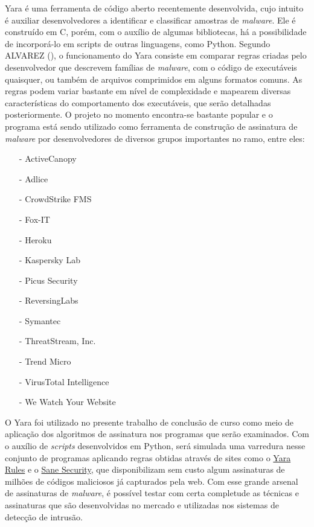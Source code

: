Yara é uma ferramenta de código aberto recentemente desenvolvida, cujo intuito é
auxiliar desenvolvedores a identificar e classificar amostras de
\textit{malware}. Ele é construído em C, porém, com o auxílio de algumas
bibliotecas, há a possibilidade de incorporá-lo em scripts de outras linguagens,
como Python. Segundo ALVAREZ (\citeyear{yararules}), o funcionamento do Yara consiste em comparar
regras criadas pelo desenvolvedor que descrevem famílias de \textit{malware},
com o código de executáveis quaisquer, ou também de arquivos comprimidos em
alguns formatos comuns. As regras podem variar bastante em nível de complexidade
e mapearem diversas características do comportamento dos executáveis, que serão
detalhadas posteriormente. O projeto no momento encontra-se bastante popular e o
programa está sendo utilizado como ferramenta de construção de assinatura de
\textit{malware} por desenvolvedores de diversos grupos importantes no ramo,
entre eles:
\begin{itemize}
	\item[-] ActiveCanopy
	\item[-] Adlice
	\item[-] CrowdStrike FMS
	\item[-] Fox-IT
	\item[-] Heroku
	\item[-] Kaspersky Lab
	\item[-] Picus Security
	\item[-] ReversingLabs
	\item[-] Symantec
	\item[-] ThreatStream, Inc.
	\item[-] Trend Micro
	\item[-] VirusTotal Intelligence
	\item[-] We Watch Your Website
\end{itemize}

O Yara foi utilizado no presente trabalho de conclusão de curso como meio de
aplicação dos algoritmos de assinatura nos programas que serão examinados. Com
o auxílio de \textit{scripts} desenvolvidos em Python, será simulada uma varredura nesse
conjunto de programas aplicando regras obtidas através de sites como o
\href{yararules.org}{Yara Rules} e o
\href{http://sanesecurity.com/usage/signatures/}{Sane Security}, que
disponibilizam sem custo algum assinaturas de milhões de códigos maliciosos já
capturados pela web. Com esse grande arsenal de assinaturas de \textit{malware}, é
possível testar com certa completude as técnicas e assinaturas que são
desenvolvidas no mercado e utilizadas nos sistemas de detecção de intrusão.

